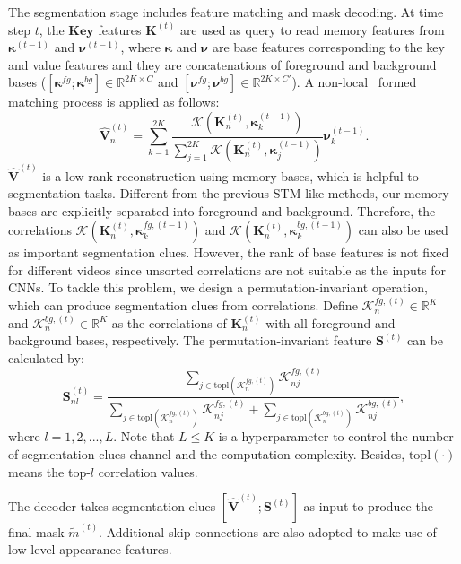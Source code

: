 The segmentation stage includes feature matching and mask decoding. At time step $t$, the $\textbf{Key}$ features $\mathbf{K}^{(t)}$ are used as query to read memory features from $\bm{\kappa}^{(t-1)}$ and $\bm{\nu}^{(t-1)}$, where $\bm{\kappa}$ and $\bm{\nu}$ are base features corresponding to the key and value features and they are concatenations of foreground and background bases ($[\bm{\kappa}^{fg}; \bm{\kappa}^{bg}]\in \mathbb{R}^{2K\times C}$ and $[\bm{\nu}^{fg}; \bm{\nu}^{bg}]\in \mathbb{R}^{2K\times C'}$).
A non-local~\cite{nonlocal} formed matching process is applied as follows:
\begin{equation}
 \hat{{\mathbf{V}}}^{(t)}_n = \sum_{k=1}^{2K}\frac{\mathcal{K}({\mathbf{K}}^{(t)}_n, \bm{\kappa}^{(t-1)}_k)}{\sum_{j=1}^{2K}\mathcal{K}({\mathbf{K}}^{(t)}_n, \bm{\kappa}^{(t-1)}_j)} \bm{\nu}^{(t-1)}_k.
 \label{eq:matching_v}
\end{equation}
$\hat{\mathbf{V}}^{(t)}$ is a low-rank reconstruction using memory bases, which is helpful to segmentation tasks. Different from the previous STM-like methods, our memory bases are explicitly separated into foreground and background. Therefore, the correlations $\mathcal{K}(\mathbf{K}^{(t)}_n, \bm{\kappa}^{fg, (t-1)}_k)$ and $\mathcal{K}(\mathbf{K}^{(t)}_n, \bm{\kappa}^{bg, (t-1)}_k)$ can also be used as important segmentation clues. However, the rank of base features is not fixed for different videos since unsorted correlations are not suitable as the inputs for CNNs. To tackle this problem, we design a permutation-invariant operation, which can produce segmentation clues from correlations. Define $\mathcal{K}^{fg, (t)}_n \in \mathbb{R}^{K}$ and $\mathcal{K}^{bg, (t)}_n \in \mathbb{R}^{K}$ as the correlations of $\mathbf{K}^{(t)}_n$ with all foreground and background bases, respectively. The permutation-invariant feature $\mathbf{S}^{(t)}$ can be calculated by:
\begin{equation}
\mathbf{S}^{(t)}_{nl} = \frac{\sum_{j\in \text{topl}(\mathcal{K}^{fg, (t)}_n)} \mathcal{K}^{fg, (t)}_{nj}}{\sum_{j\in \text{topl}(\mathcal{K}^{fg, (t)}_n)} \mathcal{K}^{fg, (t)}_{nj} + \sum_{j\in \text{topl}(\mathcal{K}^{bg, (t)}_n)} \mathcal{K}^{bg, (t)}_{nj}},
\label{eq:matching_s}
\end{equation}
where $l=1,2,...,L$. Note that $L \leq K$ is a hyperparameter to control the number of segmentation clues channel and the computation complexity. Besides, $\text{topl}(\cdot)$ means the top-$l$ correlation values.

The decoder takes segmentation clues $[\hat{\mathbf{V}}^{(t)}; \mathbf{S}^{(t)}]$ as input to produce the final mask $\tilde{m}^{(t)}$. Additional skip-connections are also adopted to make use of low-level appearance features.  

